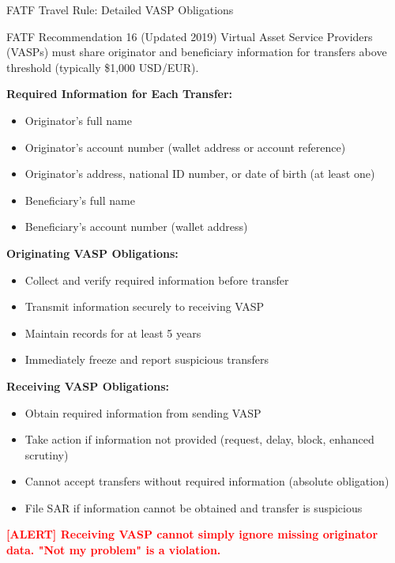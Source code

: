 \documentclass[11pt,a4paper]{beamer}
\newcommand{\redflag}[1]{\textcolor{red}{\textbf{[ALERT] #1}}}
\begin{document}
\begin{frame}{FATF Travel Rule: Detailed VASP Obligations}
	\begin{block}{FATF Recommendation 16 (Updated 2019)}
		Virtual Asset Service Providers (VASPs) must share originator and beneficiary information for transfers above threshold (typically \$1,000 USD/EUR).
	\end{block}
	\textbf{Required Information for Each Transfer:}
	\begin{itemize}
		\item Originator's full name
		\item Originator's account number (wallet address or account reference)
		\item Originator's address, national ID number, or date of birth (at least one)
		\item Beneficiary's full name
		\item Beneficiary's account number (wallet address)
	\end{itemize}
	\textbf{Originating VASP Obligations:}
	\begin{itemize}
		\item Collect and verify required information before transfer
		\item Transmit information securely to receiving VASP
		\item Maintain records for at least 5 years
		\item Immediately freeze and report suspicious transfers
	\end{itemize}
	\textbf{Receiving VASP Obligations:}
	\begin{itemize}
		\item Obtain required information from sending VASP
		\item Take action if information not provided (request, delay, block, enhanced scrutiny)
		\item Cannot accept transfers without required information (absolute obligation)
		\item File SAR if information cannot be obtained and transfer is suspicious
	\end{itemize}
	\redflag{Receiving VASP cannot simply ignore missing originator data. "Not my problem" is a violation.}
\end{frame}
\end{document}
